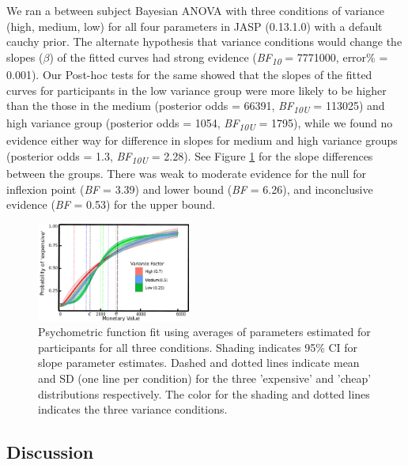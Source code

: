 \documentclass[10pt,letterpaper]{article}
\begin{document}
We ran a between subject Bayesian ANOVA with three conditions of variance (high, medium, low) for all four parameters in JASP (0.13.1.0) with a default cauchy prior. The alternate hypothesis that variance conditions would change the slopes ($\beta$) of the fitted curves had strong evidence (\textit{BF\textsubscript{10}} = 7771000, error\% = 0.001). Our Post-hoc tests for the same showed that the slopes of the fitted curves for participants in the low variance group were more likely to be higher than the those in the medium (posterior odds = 66391,  \textit{BF\textsubscript{10U}} = 113025) and high variance group (posterior odds = 1054,  \textit{BF\textsubscript{10U}} = 1795), while we found no evidence either way for difference in slopes for medium and high variance groups (posterior odds = 1.3,  \textit{BF\textsubscript{10U}} = 2.28). See Figure \ref{fig:my_label} for the slope differences between the groups. There was weak to moderate evidence for the null for inflexion point (\textit{BF} = 3.39) and lower bound (\textit{BF} = 6.26), and inconclusive evidence (\textit{BF} = 0.53) for the upper bound.


\begin{figure}[h!]
    \centering
    \includegraphics[width=0.45\textwidth]{results/slope.pdf}
    \caption{Psychometric function fit using averages of parameters estimated for participants for all three conditions. Shading indicates 95\% CI for slope parameter estimates. Dashed and dotted lines indicate mean and SD (one line per condition) for the three 'expensive' and 'cheap' distributions respectively. The color for the shading and dotted lines indicates the three variance conditions.}
    \label{fig:my_label}
\end{figure}

\subsection{Discussion}
\end{document}
